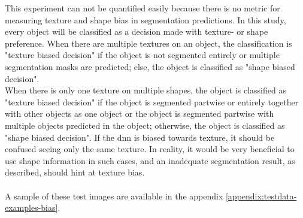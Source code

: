 		This experiment can not be quantified easily because there is no metric for measuring texture and shape bias in segmentation predictions. In this study, every object will be classified as a decision made with texture- or shape preference. When there are multiple textures on an object, the classification is "texture biased decision" if the object is not segmented entirely or multiple segmentation masks are predicted; else, the object is classified as "shape biased decision".\\
		When there is only one texture on multiple shapes, the object is classified as "texture biased decision" if the object is segmented partwise or entirely together with other objects as one object or the object is segmented partwise with multiple objects predicted in the object; otherwise, the object is classified as "shape biased decision". If the \ac{dnn} is biased towards texture, it should be confused seeing only the same texture. In reality, it would be very beneficial to use shape information in such cases, and an inadequate segmentation result, as described, should hint at texture bias.\\
		\\
		A sample of these test images are available in the appendix \ref{appendix:testdata-examples-bias}.
	
	\clearpage
	
